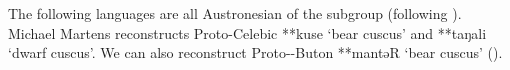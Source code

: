 The following languages are all Austronesian of the 
subgroup (following \citealp{Mead2003a,Zobel2020}).
Michael Martens reconstructs Proto-Celebic **kuse ‘bear cuscus’
and **taŋali ‘dwarf cuscus’.
We can also reconstruct Proto--Buton **mantəR ‘bear
cuscus’ ().

%

%
